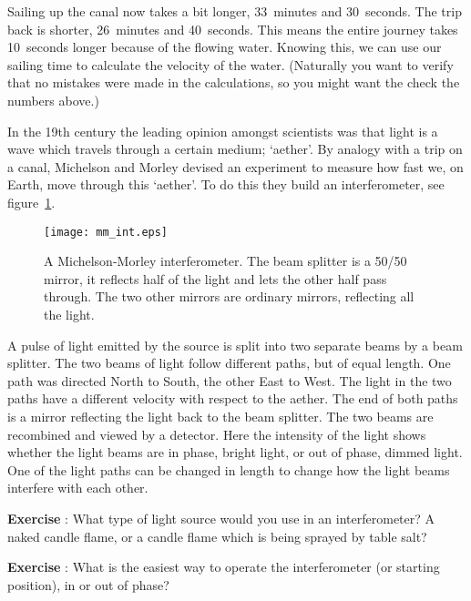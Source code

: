 Sailing up the canal now takes a bit longer, 33~minutes and 30~seconds. The trip back is shorter, 26~minutes and 40~seconds. This means the entire journey takes 10~seconds longer because of the flowing water. Knowing this, we can use our sailing time to calculate the velocity of the water. (Naturally you want to verify that no mistakes were made in the calculations, so you might want the check the numbers above.)

In the 19th century the leading opinion amongst scientists was that light is a wave which travels through a certain medium; `aether'. By analogy with a trip on a canal, Michelson and Morley devised an experiment to measure how fast we, on Earth, move through this `aether'. To do this they build an interferometer, see figure~\ref{fig:mm_int}.

\begin{figure}\begin{center}
\texttt{[image: mm\_int.eps]}
\caption{A Michelson-Morley interferometer. The beam splitter is a 50/50 mirror, it reflects half of the light and lets the other half pass through. The two other mirrors are ordinary mirrors, reflecting all the light.}\label{fig:mm_int}
\end{center}\end{figure}

A pulse of light emitted by the source is split into two separate beams by a beam splitter. The two beams of light follow different paths, but of equal length. One path was directed North to South, the other East to West. The light in the two paths have a different velocity with respect to the aether. The end of both paths is a mirror reflecting the light back to the beam splitter. The two beams are recombined and viewed by a detector. Here the intensity of the light shows whether the light beams are in phase, bright light, or out of phase,  dimmed light. One of the light paths can be changed in length to change how the light beams interfere with each other.

\begin{shaded}
\textbf{Exercise \theExercise {}} : What type of light source would you use in an interferometer? A naked candle flame, or a candle flame which is being sprayed by table salt?\footnotemark \end{shaded}

\begin{shaded}
\textbf{Exercise \theExercise {}} : What is the easiest way to operate the interferometer (or starting position), in or out of phase?\end{shaded}

